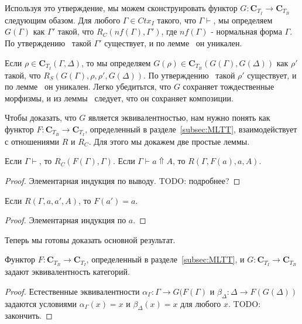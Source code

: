 \documentclass{amsart}
\theoremstyle{definition}
\theoremstyle{remark}
\newcommand{\cat}[1]{\mathbf{#1}}
\renewcommand{\C}{\cat{C}}
\numberwithin{figure}{section}
\begin{document}
Используя это утверждение, мы можем сконструировать функтор $G : \C_{T_I} \to \C_{T_B}$ следующим обазом.
Для любого $\Gamma \in Ctx_I$ такого, что $\Gamma \vdash$, мы определяем $G(\Gamma)$ как $\Gamma'$ такой, что $R_C(nf(\Gamma), \Gamma')$, где $nf(\Gamma)$ - нормальная форма $\Gamma$.
По утверждению~ такой $\Gamma'$ существует, и по лемме~ он уникален.

Если $\rho \in \C_{T_I}(\Gamma, \Delta)$, то мы определяем $G(\rho) \in \C_{T_B}(G(\Gamma), G(\Delta))$ как $\rho'$ такой, что $R_S(G(\Gamma), \rho, \rho', G(\Delta))$.
По утверждению~ такой $\rho'$ существует, и по лемме~ он уникален.
Легко убедитьтся, что $G$ сохраняет тождественные морфизмы, и из леммы~ следует, что он сохраняет композиции.

Чтобы доказать, что $G$ является эквивалентностью, нам нужно понять как функтор $F : \C_{T_B} \to \C_{T_I}$, определенный в разделе~\ref{subsec:MLTT}, взаимодействует с отношениями $R$ и $R_C$.
Для этого мы докажем две простые леммы.
\begin{lem}
Если $\Gamma \vdash$, то $R_C(F(\Gamma), \Gamma)$.
Если $\Gamma \vdash a \Uparrow A$, то $R(\Gamma, F(a), a, A)$.
\end{lem}
\begin{proof}
Элементарная индукция по выводу.
TODO: подробнее?
\end{proof}

\begin{lem}
Если $R(\Gamma, a, a', A)$, то $F(a') = a$.
\end{lem}
\begin{proof}
Элементарная индукция по $a$.
\end{proof}

Теперь мы готовы доказать основной результат.
\begin{thm}[equiv]
Функтор $F : \C_{T_B} \to \C_{T_I}$, определенный в разделе~\ref{subsec:MLTT}, и $G : \C_{T_I} \to \C_{T_B}$ задают эквивалентность категорий.
\end{thm}
\begin{proof}
Естественные эквивалентности $\alpha_\Gamma : \Gamma \to G(F(\Gamma)$ и $\beta_\Delta : \Delta \to F(G(\Delta))$ задаются условиями $\alpha_\Gamma(x) = x$ и $\beta_\Delta(x) = x$ для любого $x$.
TODO: закончить.
\end{proof}



\end{document}

